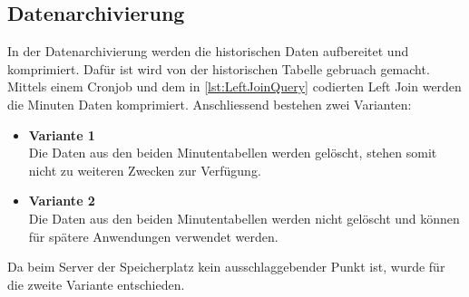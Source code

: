 \subsection{Datenarchivierung}

In der Datenarchivierung werden die historischen Daten aufbereitet und komprimiert. Dafür ist wird von der historischen Tabelle gebruach gemacht. Mittels einem Cronjob und dem in \ref{lst:LeftJoinQuery} codierten Left Join werden die Minuten Daten komprimiert. Anschliessend bestehen zwei Varianten:\\
\begin{itemize}
\item \textbf{Variante 1}\\
Die Daten aus den beiden Minutentabellen werden gelöscht, stehen somit nicht zu weiteren Zwecken zur Verfügung.
\item \textbf{Variante 2}\\
Die Daten aus den beiden Minutentabellen werden nicht gelöscht und können für spätere Anwendungen verwendet werden.
\end{itemize}

Da beim Server der Speicherplatz kein ausschlaggebender Punkt ist, wurde für die zweite Variante entschieden. 


